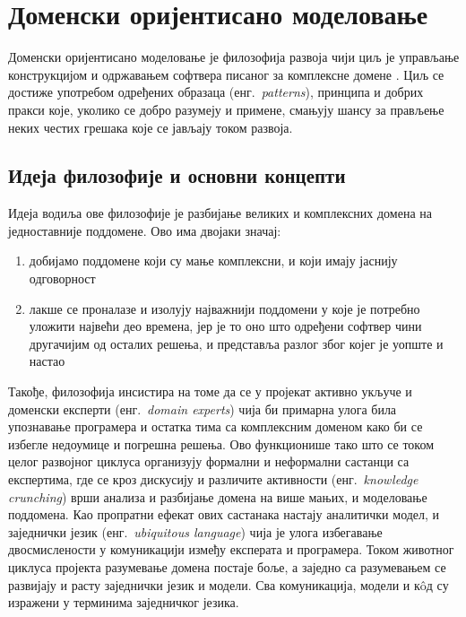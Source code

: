 \documentclass[12pt,oneside]{memoir}
\begin{document}
\chapter{Доменски оријентисано моделовање}\label{domenskiorijentisanomodelovanje}
Доменски оријентисано моделовање је филозофија развоја чији циљ је управљање конструкцијом и одржавањем софтвера писаног за комплексне домене \cite{DomainDrivenDessign}. Циљ се достиже употребом одређених образаца (енг.~\textit{patterns}), принципа и добрих пракси које, уколико се добро разумеју и примене, смањују шансу за прављење неких честих грешака које се јављају током развоја.

\section{Идеја филозофије и основни концепти}
Идеја водиља ове филозофије је разбијање великих и комплексних домена на једноставније поддомене. Ово има двојаки значај:
\begin{enumerate}
\item добијамо поддомене који су мање комплексни, и који имају јаснију одговорност
\item лакше се проналазе и изолују најважнији поддомени у које је потребно уложити највећи део времена, јер је то оно што одређени софтвер чини другачијим од осталих решења, и представља разлог због којег је уопште и настао
\end{enumerate}

Такође, филозофија инсистира на томе да се у пројекат активно укључе и доменски експерти (енг.~\textit{domain experts}) чија би примарна улога била упознавање програмера и остатка тима са комплексним доменом како би се избегле недоумице и погрешна решења. Ово функционише тако што се током целог развојног циклуса организују формални и неформални састанци са експертима, где се кроз дискусију и различите активности (енг.~\textit{knowledge crunching}) врши анализа и разбијање домена на више мањих, и моделовање поддомена. Као пропратни ефекат ових састанака настају аналитички модел, и заједнички језик (енг.~\textit{ubiquitous language}) чија је улога избегавање двосмислености у комуникацији између експерата и програмера. Током животног циклуса пројекта разумевање домена постаје боље, а заједно са разумевањем се развијају и расту заједнички језик и модели. Сва комуникација, модели и кôд су изражени у терминима заједничког језика.
\end{document}
